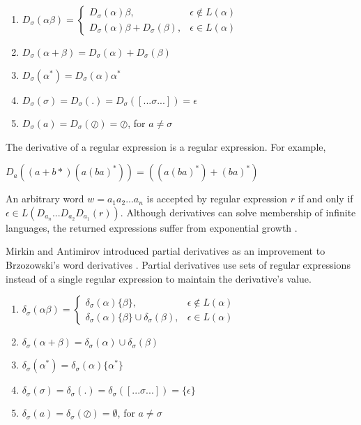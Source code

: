 \begin{enumerate}
  \item $D_\sigma(\alpha \beta) = \begin{cases}
      D_\sigma(\alpha) \beta,              & \epsilon \notin L(\alpha) \\
      D_\sigma(\alpha) \beta + D_\sigma(\beta), & \epsilon \in L(\alpha)
    \end{cases}$
  \item $D_\sigma(\alpha + \beta) = D_\sigma(\alpha) + D_\sigma(\beta)$
  \item $D_\sigma(\alpha^*) = D_\sigma(\alpha) \alpha^*$
  \item $D_\sigma(\sigma) = D_\sigma(.) = D_\sigma([...\sigma...]) = \epsilon$
  \item $D_\sigma(a) = D_\sigma(\oslash) = \oslash$, for $a \neq \sigma$
\end{enumerate}
The derivative of a regular expression is a regular expression. For example,
\begin{center}
  $D_a((a + b*) (a (ba)^*)) = ((a (ba)^*) + (ba)^*)$  
\end{center}
An arbitrary word $w = a_1a_2...a_n$ is accepted by regular expression $r$ if and only if $\epsilon \in L(D_{a_n}...D_{a_2}D_{a_1}(r))$. Although derivatives can solve membership of infinite languages, the returned expressions suffer from exponential growth \cite{Antimirov}.

Mirkin and Antimirov introduced partial derivatives as an improvement to Brzozowski's word derivatives \cite{Antimirov, mirkin66}. Partial derivatives use sets of regular expressions instead of a single regular expression to maintain the derivative's value.
\begin{enumerate}
  \item $\delta_\sigma(\alpha \beta) = \begin{cases}
      \delta_\sigma(\alpha) \{\beta\},                        & \epsilon \notin L(\alpha) \\
      \delta_\sigma(\alpha) \{\beta \} \cup \delta_\sigma(\beta), & \epsilon \in L(\alpha)
    \end{cases}$
  \item $\delta_\sigma(\alpha + \beta) = \delta_\sigma(\alpha) \cup \delta_\sigma(\beta)$
  \item $\delta_\sigma(\alpha^*) = \delta_\sigma(\alpha) \{\alpha^*\}$
  \item $\delta_\sigma(\sigma) = \delta_\sigma(.) = \delta_\sigma([...\sigma...]) = \{\epsilon\}$
  \item $\delta_\sigma(a) = \delta_\sigma(\oslash) = \emptyset$, for $a \neq \sigma$
\end{enumerate}

